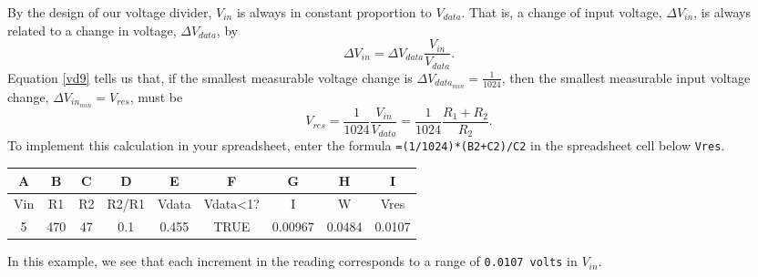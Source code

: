 \begin{enumerate}
	\smallskip
	By the design of our voltage divider, $V_{in}$ is always in constant proportion to $V_{data}$.
	That is, a change of input voltage, $\Delta V_{in}$, is always related to a change in \adc voltage, $\Delta V_{data}$, by
	\begin{equation}\label{vd9}
	\Delta V_{in} =  \Delta V_{data} \frac{V_{in}}{V_{data}}.
	\end{equation}
	Equation \ref{vd9} tells us that, if the smallest measurable \adc voltage change is $\Delta V_{data_{min}}=\frac{1}{1024}$, then the smallest measurable input voltage change, $\Delta V_{in_{min}}=V_{res}$, must be
	\begin{equation}\label{vd8}
	V_{res} = \frac{1}{1024} \frac{V_{in}}{V_{data}} = \frac{1}{1024} \frac{R_1+R_2}{R_2}.
\end{equation}
%
%
	To implement this calculation in your spreadsheet, enter the formula \lstinline{=(1/1024)*(B2+C2)/C2} in the spreadsheet cell below \texttt{Vres}.
	\begin{table}[H]
	\centering
	\begin{small}
	\begin{tabular}{|c|c|c|c|c|c|c|c|c|}
		\hline
		\textbf{A}  & \textbf{B} & \textbf{C} & \textbf{D} & \textbf{E} & \textbf{F} & \textbf{G} & \textbf{H} & \textbf{I} \\
		\hline
		Vin  & R1 & R2 & R2/R1 & Vdata & Vdata<1? & I & W & Vres \\
		\hline
		5 & 470  & 47 & 0.1 & 0.455 & TRUE & 0.00967 & 0.0484 & 0.0107 \\
		\hline
	\end{tabular}
	\end{small}
	\end{table}
	In this example, we see that each increment in the \adc reading corresponds to a range of \texttt{0.0107 volts} in $V_{in}$.


\end{enumerate}
